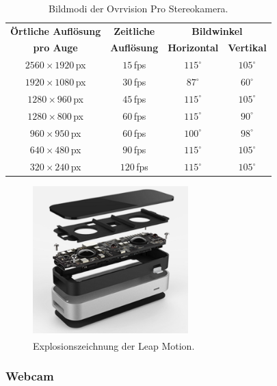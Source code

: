 \begin{table}
	\centering
	\begin{tabular}{|c|c|c|c|}
		\hline
		\Absatzbox{}
		\textbf{Örtliche Auflösung}& \textbf{Zeitliche} & \multicolumn{2}{c|}{\textbf{Bildwinkel}}\\
		\cline{3-4}
		\Absatzbox{}
		\textbf{pro Auge}& \textbf{Auflösung} & \textbf{Horizontal} & \textbf{Vertikal}\\
		\hline
		$2560\times1920$\,px & $15$\,fps & $115^\circ$ & $105^\circ$\\
		\hline
		$1920\times1080$\,px & $30$\,fps & $87^\circ$ & $60^\circ$\\
		\hline
		$1280\times960$\,px & $45$\,fps & $115^\circ$ & $105^\circ$\\
		\hline
		$1280\times800$\,px & $60$\,fps & $115^\circ$ & $90^\circ$\\
		\hline
		$960\times950$\,px & $60$\,fps & $100^\circ$ & $98^\circ$\\
		\hline
		$640\times480$\,px & $90$\,fps & $115^\circ$ & $105^\circ$\\
		\hline
		$320\times240$\,px & $120$\,fps & $115^\circ$ & $105^\circ$\\
		\hline
	\end{tabular}
	\caption{Bildmodi der Ovrvision Pro Stereokamera.\textsuperscript{\cite{website:ovrvisionProduct}}}
	\label{tab:ovrRes}
\end{table}

\begin{figure}[H]
	\centering
	\includegraphics[width=6cm]{Bilder/leap-motion.png}			
		\caption{Explosionszeichnung der Leap Motion.\textsuperscript{\cite{website:LeapMotionBlog}}}
		\label{fig:leapMotion}
\end{figure}
	
\subsubsection{Webcam}


